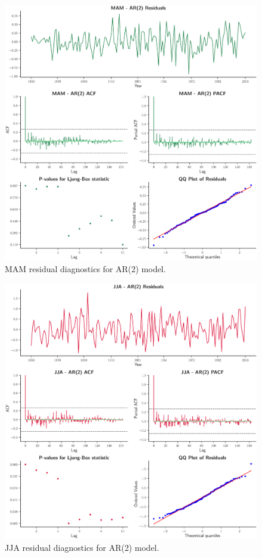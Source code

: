 \documentclass[12pt]{article}
\begin{document}
\begin{figure}[H]
  \includegraphics[width=1\textwidth,center]{figs/mam_res}
  \caption{MAM residual diagnostics for AR(2) model.}\label{mam_res}
\end{figure}

\begin{figure}[H]
  \centering
  \includegraphics[width=1\textwidth,center]{figs/jja_res}
  \caption{JJA residual diagnostics for AR(2) model.}\label{jja_res}
\end{figure}
\end{document}
